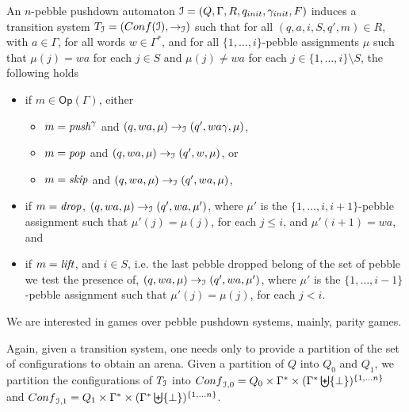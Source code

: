 \documentclass[a4paper,UKenglish,cleveref, autoref, thm-restate]{lipics-v2021}
\newcommand{\Conf}{\mathsf{Conf}}
\newcommand{\Op}{\mathsf{Op}}
\begin{document}
\begin{samepage}
An $n$-pebble pushdown automaton $\mathcal{I} =  (Q, \Gamma,  R, q_{init}, {\gamma_{init}} , F)$ induces 
a transition system  $T_{\ppda} = (\Conf(\ppda), \rightarrow_{\ppda})$ 
 such that
for all $(q, a, i, S, q', m) \in R$, with $a \in \Gamma$,
 for all words $w \in  \Gamma^*$, and for all $\{ 1, \ldots , i \}$-pebble assignments $\mu$ such that $\mu(j) = wa$ 
 for each
$j \in S$ 	and
 $\mu(j) \neq wa$ 
 for each $j \in \{ 1, \ldots , i \} \setminus S$,
the following holds
\begin{itemize}
\item if $m \in \Op(\Gamma)$, 
either
\begin{itemize}
\item $ m = \text{\textit{push}}^\gamma$ and $(q,wa,\mu) \rightarrow_{\mathcal{I}} (q',wa\gamma, \mu)$,

\item $ m = \text{\textit{pop}}$ and $(q,wa,\mu) \rightarrow_{\mathcal{I}} (q',w, \mu)$, or

\item $ m = \text{\textit{skip}}$ and $(q,wa,\mu) \rightarrow_{\mathcal{I}} (q',wa, \mu)$,
\end{itemize}
\item if $ m = \text{\textit{drop}}$, 
$(q,wa,\mu) \rightarrow_{\mathcal{I}} (q',wa, \mu')$,  
where $\mu'$ is the $\{ 1, \ldots , i, i+1 \}$-pebble assignment such that
$\mu'(j) = \mu(j)$, for each
$j \leq i$, and $\mu'(i+1) = wa$, and
\item if $m = \text{\textit{lift}}$, and $i \in S$, i.e. the last pebble dropped belong of the set of pebble we test the presence of,
$(q,wa,\mu) \rightarrow_{\mathcal{I}} (q',wa, \mu')$, 
where $\mu'$ is the $\{ 1, \ldots , i - 1 \}$-pebble assignment such that
$\mu'(j) = \mu(j)$, for each
$j < i$.
\end{itemize}
\end{samepage}


\par\noindent\ignorespacesafterend
We are interested in games over pebble pushdown systems, %
mainly, parity games.

Again, given
a 
 transition system, one needs only to provide 
a partition of the set of
configurations 
 to obtain an arena.
Given a partition of
$Q$ into $Q_0$ and $Q_1$, 
we partition the configurations of
$T_{\mathcal{I}}$
into
$\Conf_{\ppda,0}=Q_0\times \Gamma^* \times ( \Gamma^* \biguplus \{ \bot \})^{\{1, \ldots n\}}$
and
$\Conf_{\ppda,1}=Q_1\times  \Gamma^* \times ( \Gamma^* \biguplus \{ \bot \})^{\{1, \ldots n\}}$. 
\end{document}
